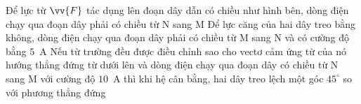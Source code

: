 \begin{ex}
		{\True Để lực từ $\vv{F}$ tác dụng lên đoạn dây dẫn có chiều như hình bên, dòng điện chạy qua đoạn dây phải có chiều từ N sang M}
		{\True Để lực căng của hai dây treo bằng không, dòng điện chạy qua đoạn dây phải có chiều từ M sang N và có cường độ bằng $5$~A}
		{Nếu từ trường đều được điều chỉnh sao cho vectơ cảm ứng từ của nó hướng thẳng đứng từ dưới lên và dòng điện chạy qua đoạn dây có chiều từ N sang M với cường độ $10$~A thì khi hệ cân bằng, hai dây treo lệch một góc $45^\circ$ so với phương thẳng đứng}
	\end{ex}

